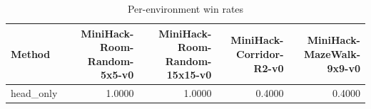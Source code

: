 \begin{table}[htbp]
\centering
\caption{Per-environment win rates}
\label{tab:per-env}
\begin{tabular}{lrrrr}
\toprule
\textbf{Method} & \textbf{MiniHack-Room-Random-5x5-v0} & \textbf{MiniHack-Room-Random-15x15-v0} & \textbf{MiniHack-Corridor-R2-v0} & \textbf{MiniHack-MazeWalk-9x9-v0} \\
\midrule
head\_only & 1.0000 & 1.0000 & 0.4000 & 0.4000 \\
\bottomrule
\end{tabular}
\end{table}